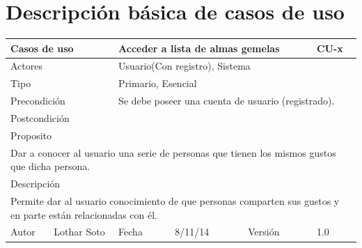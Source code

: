 \documentclass{article}
\begin{document}
\section{Descripción básica de casos de uso}

\begin{table}[h]
\begin{tabular}{|l|l|l|l|l|l|}
\hline
\multicolumn{2}{|p{2cm}|}{Casos de uso}  & \multicolumn{3}{p{7cm}|}{\textbf{Acceder a lista de almas gemelas}} & CU-x \\
\hline
\multicolumn{2}{|p{2cm}|}{Actores}       & \multicolumn{4}{p{8cm}|}{Usuario(Con registro), Sistema}        \\
\hline
\multicolumn{2}{|p{2cm}|}{Tipo}          & \multicolumn{4}{p{8cm}|}{Primario, Esencial}        \\
\hline
\multicolumn{2}{|p{2cm}|}{Precondición}  & \multicolumn{4}{p{8cm}|}{Se debe poseer una cuenta de usuario (registrado).}        \\
\hline
\multicolumn{2}{|p{2cm}|}{Postcondición} & \multicolumn{4}{p{8cm}|}{}        \\
\hline
\multicolumn{6}{|p{10cm}|}{Proposito}                                   \\
\hline
\multicolumn{6}{|p{10cm}|}{Dar a conocer al usuario una serie de personas que tienen los mismos gustos que dicha persona.}                                            \\
\hline
\multicolumn{6}{|p{10cm}|}{Descripción}                                 \\
\hline
\multicolumn{6}{|p{10cm}|}{Permite dar al usuario conocimiento de que personas comparten sus gustos y en parte están relacionadas con él.}                                            \\
\hline
Autor          &       Lothar Soto        & Fecha    &  8/11/14   &   Versión  & 1.0\\    
\hline
\end{tabular}
\end{table}
\end{document}

